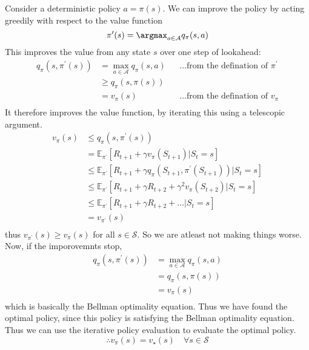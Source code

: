 Consider a deterministic policy \(a = \pi(s)\). We can improve the policy by acting
greedily with respect to the value function
\[
        \pi^{\prime}(s) = \argmax_{a \in \mathcal{A}} q_{\pi}(s,a)
\]
This improves the value from any state \(s\) over one step of lookahead:
\[
    \begin{aligned}
            q_{\pi}(s, \pi^{\prime}(s)) 
            &= \max_{a \in \mathcal{A}} q_{\pi}(s,a) &&\dots\text{from the 
            defination of \(\pi ^{\prime}\)}\\
            &\geq q_{\pi}(s, \pi(s))\\
            &= v_{\pi}(s) &&\dots\text{from the defination of \(v_{\pi}\)}\\
    \end{aligned}
\]
It therefore improves the value function, by iterating this using a telescopic argument.
\[
        \begin{aligned}
            v_\pi (s) &\leq q_{\pi}(s, \pi^{\prime}(s)) \\
            &= \mathbb{E}_{\pi^{\prime}} \left[ R_{t+1} + \gamma v_{\pi}(S_{t+1}) |
             S_{t} = s \right] \\
                &\leq \mathbb{E}_{\pi^{\prime}} \left[ R_{t+1} + \gamma q_{\pi}(S_{t+1}, \pi^{\prime}(S_{t+1})) |
                S_{t} = s \right] \\
                &\leq \mathbb{E}_{\pi^{\prime}} \left[ R_{t+1} + \gamma R_{t+2} + \gamma^{2} v_{\pi}(S_{t+2}) |
                S_{t} = s \right] \\
                &\leq \mathbb{E}_{\pi^{\prime}} \left[ R_{t+1} + \gamma R_{t+2} + \dots |
                S_{t} = s \right] \\
                &= v_{\pi^{\prime}}(s) \\
        \end{aligned}  
\]
thus \(v_{\pi^{\prime}}(s) \geq v_{\pi}(s)\) for all \(s \in \mathcal{S}\). So we are
atleast not making things worse. Now, if the imporovemnts stop,
\[
    \begin{aligned}
        q_\pi (s, \pi^{\prime}(s)) &= \max_{a \in \mathcal{A}} q_{\pi}(s,a) \\
        &= q_{\pi}(s, \pi(s)) \\
        &= v_{\pi}(s) \\ 
    \end{aligned}
\]
which is basically the Bellman optimality equation. Thus we have found the optimal policy, 
since this policy is satisfying the Bellman optimality equation. Thus we can use the iterative
policy evaluation to evaluate the optimal policy.
\[
    \therefore v_\pi (s) = v_{\star} (s) \quad \forall s \in \mathcal{S}
\]


